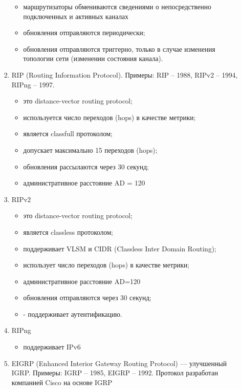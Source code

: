 \begin{enumerate}
\begin{itemize}
        \item маршрутизаторы обмениваются сведениями
        о непосредственно подключенных и активных каналах
        \item обновления отправляются периодически;
        \item обновления отправляются триггерно,
        только в случае изменения топологии сети
        (изменении состояния канала).
    \end{itemize}
    \item RIP (Routing Information Protocol).
    Примеры: RIP – 1988, RIPv2 – 1994, RIPng – 1997.
    \begin{itemize}
        \item это distance-vector routing protocol;
        \item используется число переходов (hops) в качестве метрики;
        \item является classfull протоколом;
        \item допускает максимально 15 переходов (hops);
        \item обновления рассылаются через 30 секунд;
        \item административное расстояние AD = 120
    \end{itemize}
    \item RIPv2
    \begin{itemize}
        \item это distance-vector routing protocol;
        \item является classless протоколом;
        \item поддерживает VLSM и CIDR (Classless Inter Domain Routing);
        \item использует число переходов (hops) в качестве метрики;
        \item административное расстояние AD=120
        \item обновления отправляются через 30 секунд;
        \item - поддерживает аутентификацию.
    \end{itemize}
    \item RIPng
    \begin{itemize}
        \item поддерживает IPv6
    \end{itemize}
    \item EIGRP (Enhanced Interior Gateway Routing Protocol)
    --- улучшенный IGRP. Примеры: IGRP – 1985, EIGRP – 1992.
    Протокол разработан компанией Cisco на основе IGRP

\end{enumerate}
